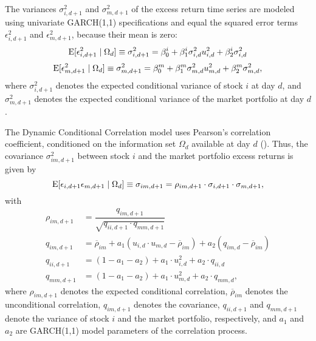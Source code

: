 \documentclass[11pt,a4paper]{article}
\begin{document}
The variances $\sigma_{i,d+1}^2$ and $\sigma_{m,d+1}^2$ of the excess return time series are modeled using univariate GARCH(1,1) specifications and equal the squared error terms $\epsilon_{i,d+1}^2$ and $\epsilon_{m,d+1}^2$, because their mean is zero:
\begin{equation}
    \textrm{E}[\epsilon_{i,d+1}^2 \mid \Omega_d] \equiv \sigma_{i,d+1}^2 = \beta_0^i + \beta_1^i \sigma_{i,d}^2 u_{i,d}^2 + \beta_2^i \sigma_{i,d}^2
\end{equation}
\begin{equation} \label{eq:DCC_variance_market}
    \textrm{E}[\epsilon_{m,d+1}^2 \mid \Omega_d] \equiv \sigma_{m,d+1}^2 = \beta_0^m + \beta_1^m \sigma_{m,d}^2 u_{m,d}^2 + \beta_2^m \sigma_{m,d}^2,
\end{equation}
where $\sigma_{i,d+1}^2$ denotes the expected conditional variance of stock $i$ at day $d$, and $\sigma_{m,d+1}^2$ denotes the expected conditional variance of the market portfolio at day $d$.

The Dynamic Conditional Correlation model uses Pearson's correlation coefficient, conditioned on the information set $\Omega_d$ available at day $d$ (). Thus, the covariance $\sigma^2_{im,d+1}$ between stock $i$ and the market portfolio excess returns is given by
\begin{equation} \label{eq:DCC_covariance}
    \textrm{E}[\epsilon_{i,d+1} \epsilon_{m,d+1} \mid \Omega_d] \equiv \sigma_{im,d+1} =  \rho_{im,d+1} \cdot \sigma_{i,d+1} \cdot \sigma_{m,d+1},
\end{equation}
with
\begin{equation}
\begin{split}
    \rho_{im,d+1} &= \dfrac{q_{im,d+1}}{\sqrt{q_{ii,d+1} \cdot q_{mm,d+1}}} \\
    q_{im,d+1} &= \overline{\rho}_{im} + a_1(u_{i,d} \cdot u_{m,d} - \overline{\rho}_{im}) + a_2(q_{im,d} - \overline{\rho}_{im}) \\
    q_{ii,d+1} &= (1 - a_1 - a_2) + a_1 \cdot u_{i,d}^2 + a_2 \cdot q_{ii,d} \\
    q_{mm,d+1} &= (1 - a_1 - a_2) + a_1 \cdot u_{m,d}^2 + a_2 \cdot q_{mm,d} ,
\end{split}
\end{equation}
where $\rho_{im,d+1}$ denotes the expected conditional correlation, $\overline{\rho}_{im}$ denotes the unconditional correlation, $q_{im,d+1}$ denotes the covariance, $q_{ii,d+1}$ and $q_{mm,d+1}$ denote the variance of stock $i$ and the market portfolio, respectively, and $a_1$ and $a_2$ are GARCH(1,1) model parameters of the correlation process.
\end{document}
